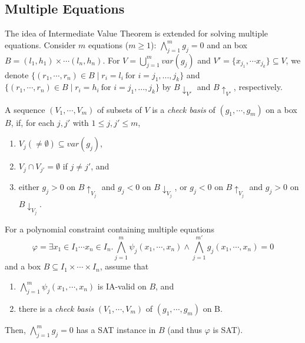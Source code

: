 \documentclass[runningheads,a4paper,oribibl]{llncs}
\newcommand{\suppress}[1]{} %
\begin{document}
\subsection{Multiple Equations}
The idea of Intermediate Value Theorem is extended for solving multiple equations. 
Consider $m$ equations ($m \ge 1$): $\bigwedge \limits_{j=1}^m g_j = 0$ and 
an box $B = {(l_1, h_1) \times \cdots (l_n, h_n)}$.
For $V = \bigcup \limits_{j=1}^m var(g_j)$ and $V' = \{x_{j_1}, \cdots x_{j_k} \} \subseteq V$,
we denote $\{ (r_1, \cdots, r_n) \in B \mid r_i = l_i~\text{for }i=j_1,...,j_k \}$
and ${\{ (r_1, \cdots, r_n) \in B \mid r_i = h_i~\text{for }i=j_1,...,j_k \}}$
by $B\downarrow_{V'}$ and $B\uparrow_{V'}$, respectively. 

\begin{definition} \label{def:CheckBasis} 
A sequence $(V_1, \cdots, V_m)$ of subsets of $V$ is a {\em check basis} of $(g_1, \cdots, g_m)$ on a box $B$,
if, for each $j,j'$ with $1 \leq j, j' \leq m$, 
\begin{enumerate}
\item $V_j (\neq \emptyset) \subseteq var(g_j)$, 
\item $V_j \cap V_{j'} = \emptyset$ if $j \neq j'$, and 
\item either $g_j > 0$ on $B\uparrow_{V_j}$ and $g_j < 0$ on $B\downarrow_{V_j}$, or
      $g_j < 0$ on $B\uparrow_{V_j}$ and $g_j > 0$ on $B\downarrow_{V_j}$. 
\end{enumerate}
\end{definition} 
\suppress{
For all $j\in \{1, \cdots, m\}$, let $k_j = |V_j|$ and
${V_j = \{v_{jk} \mid 1 \le k \le k_j \}}$, then, there exist two combinations
${(x_{j1}, \cdots, x_{jk_j}) = (t_{j1}, \cdots, t_{jk_j})}$ and
${(x_{j1}, \cdots, x_{jk_j}) = (t'_{j1}, \cdots, t'_{jk_j})}$
where $t_{jk} \neq t'_{jk} \in (l_{jk}, h_{jk})$, $1 \le k \le k_j$ such that
\[g_j(t_{j1}, \cdots, t_{jk_j}, \cdots, x_{jk}, \cdots) > 0\] and
\[g_j(t'_{j1}, \cdots, t'_{jk_j}, \cdots, x_{jk}, \cdots) < 0\]
for all values of $x_{jk}$ in $(l_{jk}, h_{jk})$ where $x_{jk} \in var(g_j) \setminus V_j$.
We denote $ivt(g_j, V_j, I)$ to represent that the polynomial $g_j$ enjoy this property
with respect to $V_j$ and $I$.
} %

\begin{lemma} \label{lem:multieq}
For a polynomial constraint containing multiple equations \[\varphi= \exists x_1 \in I_1 \cdots x_n \in I_n.
\bigwedge \limits_{j=1}^m \psi_j(x_1,\cdots,x_n) \wedge
\bigwedge \limits_{j=1}^{m'} g_j(x_1,\cdots,x_n) = 0\]
and a box $B \subseteq I_1 \times \cdots \times I_n$, 
assume that
\begin{enumerate}
\item $\bigwedge \limits_{j=1}^m \psi_j(x_1,\cdots,x_n)$ is IA-valid on $B$, and
\item there is a {\em check basis} $(V_1, \cdots, V_m)$ of $(g_1, \cdots, g_m)$ on B. 
\end{enumerate}
Then, $\bigwedge \limits_{j=1}^m g_j = 0$ has a SAT instance in $B$
(and thus $\varphi$ is SAT). 
\end{lemma}
\end{document}
